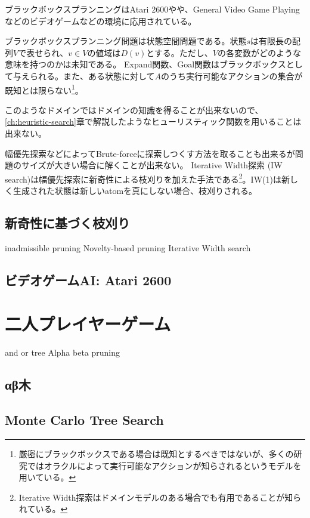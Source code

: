 \documentclass[b5paper]{report}
\begin{document}
ブラックボックスプランニングはAtari 2600や\cite{lipovetzky2015a}や、General Video Game Playing \cite{geffner2015}などのビデオゲームなどの環境に応用されている。

ブラックボックスプランニング問題は状態空間問題である。状態$s$は有限長の配列$V$で表せられ、$v \in V$の値域は$D(v)$とする。ただし、$V$の各変数がどのような意味を持つのかは未知である。
Expand関数、Goal関数はブラックボックスとして与えられる。また、ある状態に対して$A$のうち実行可能なアクションの集合が既知とは限らない\footnote{厳密にブラックボックスである場合は既知とするべきではないが、多くの研究ではオラクルによって実行可能なアクションが知らされるというモデルを用いている。}。

このようなドメインではドメインの知識を得ることが出来ないので、\ref{ch:heuristic-search}章で解説したようなヒューリスティック関数を用いることは出来ない。

幅優先探索などによってBrute-forceに探索しつくす方法を取ることも出来るが問題のサイズが大きい場合に解くことが出来ない\cite{Bellemare2013}。
Iterative Width探索 (IW search)\cite{lipovetzky2015a}は幅優先探索に新奇性による枝刈りを加えた手法である\footnote{Iterative Width探索はドメインモデルのある場合でも有用であることが知られている\cite{lipovetzkyg12}。}。IW(1)は新しく生成された状態は新しいatomを真にしない場合、枝刈りされる。

\subsection{新奇性に基づく枝刈り}
\label{sec:novelty-based-pruning}
inadmissible pruning
 Novelty-based pruning
 Iterative Width search

\subsection{ビデオゲームAI: Atari 2600} 
\label{sec:video-game}

\section{二人プレイヤーゲーム}
\label{sec:two-player-game}
and or tree
Alpha beta pruning

\subsection{αβ木}
\label{sec:alpha-beta-tree}

\subsection{Monte Carlo Tree Search}
\label{sec:monte-carlo-tree-search}
\end{document}
